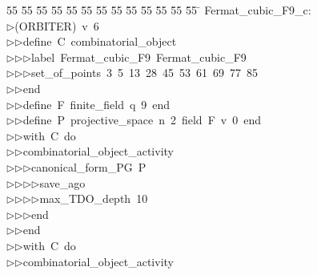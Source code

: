 %
%
\begin{tabbing}
55 \= 55 \= 55 \= 55 \= 55 \= 55 \= 55 \= 55 \= 55 \= 55 \= 55 \= 55 \= 55 \= \kill
Fermat\_cubic\_F9\_c:\\[0pt]
$\triangleright$\>(ORBITER)\ v\ 6\ \\[0pt]
$\triangleright$\>$\triangleright$\>define\ C\ combinatorial\_object\ \\[0pt]
$\triangleright$\>$\triangleright$\>$\triangleright$\>label\ Fermat\_cubic\_F9\ Fermat\_cubic\_F9\ \\[0pt]
$\triangleright$\>$\triangleright$\>$\triangleright$\>set\_of\_points\ 3\ 5\ 13\ 28\ 45\ 53\ 61\ 69\ 77\ 85\ \\[0pt]
$\triangleright$\>$\triangleright$\>end\ \\[0pt]
$\triangleright$\>$\triangleright$\>define\ F\ finite\_field\ q\ 9\ end\ \\[0pt]
$\triangleright$\>$\triangleright$\>define\ P\ projective\_space\ n\ 2\ field\ F\ v\ 0\ end\ \\[0pt]
$\triangleright$\>$\triangleright$\>with\ C\ do\ \\[0pt]
$\triangleright$\>$\triangleright$\>combinatorial\_object\_activity\ \\[0pt]
$\triangleright$\>$\triangleright$\>$\triangleright$\>canonical\_form\_PG\ P\ \\[0pt]
$\triangleright$\>$\triangleright$\>$\triangleright$\>$\triangleright$\>save\_ago\ \\[0pt]
$\triangleright$\>$\triangleright$\>$\triangleright$\>$\triangleright$\>max\_TDO\_depth\ 10\ \\[0pt]
$\triangleright$\>$\triangleright$\>$\triangleright$\>end\ \\[0pt]
$\triangleright$\>$\triangleright$\>end\ \\[0pt]
$\triangleright$\>$\triangleright$\>with\ C\ do\ \\[0pt]
$\triangleright$\>$\triangleright$\>combinatorial\_object\_activity\ \\[0pt]

\end{tabbing}
